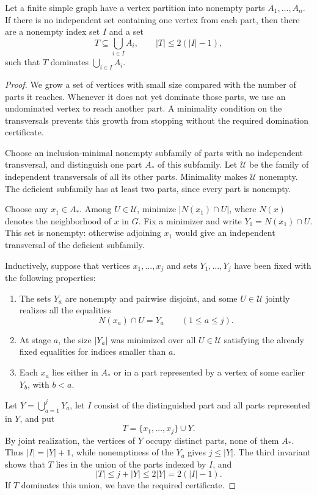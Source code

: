 \begin{lemma}\label{sel-domination}
Let a finite simple graph have a vertex partition into nonempty parts
$A_1,\ldots,A_n$.  If there is no independent set containing one
vertex from each part, then there are a nonempty index set $I$ and a set
\[
 T\subseteq\bigcup_{i\in I}A_i,
 \qquad |T|\le 2(|I|-1),
\]
such that $T$ dominates $\bigcup_{i\in I}A_i$.
\end{lemma}

\begin{proof}
We grow a set of vertices with small size compared with the number
of parts it reaches. Whenever it does not yet dominate those parts,
we use an undominated vertex to reach another part. A minimality
condition on the transversals prevents this growth from stopping
without the required domination certificate.

Choose an inclusion-minimal nonempty subfamily of parts with no
independent transversal, and distinguish one part $A_*$ of this
subfamily.  Let $\mathcal U$ be the family of independent transversals of
all its other parts.  Minimality makes $\mathcal U$ nonempty.  The
deficient subfamily has at least two parts, since every part is nonempty.

Choose any $x_1\in A_*$.  Among $U\in\mathcal U$, minimize
$|N(x_1)\cap U|$, where $N(x)$ denotes the neighborhood of $x$ in $G$.
Fix a minimizer and write $Y_1=N(x_1)\cap U$.  This set is nonempty:
otherwise adjoining $x_1$ would give an independent transversal of the
deficient subfamily.

Inductively, suppose that vertices $x_1,\ldots,x_j$ and sets
$Y_1,\ldots,Y_j$ have been fixed with the following properties:
\begin{enumerate}
 \item The sets $Y_a$ are nonempty and pairwise disjoint, and some
 $U\in\mathcal U$ jointly realizes all the equalities
 \[
   N(x_a)\cap U=Y_a\qquad(1\le a\le j).
 \]
 \item At stage $a$, the size $|Y_a|$ was minimized over all
 $U\in\mathcal U$ satisfying the already fixed equalities for indices
 smaller than $a$.
 \item Each $x_a$ lies either in $A_*$ or in a part represented by a
 vertex of some earlier $Y_b$, with $b<a$.
\end{enumerate}
Let $Y=\bigcup_{a=1}^jY_a$, let $I$ consist of the distinguished part
and all parts represented in $Y$, and put
\[
 T=\{x_1,\ldots,x_j\}\cup Y.
\]
By joint realization, the vertices of $Y$ occupy distinct parts, none
of them $A_*$.  Thus $|I|=|Y|+1$, while nonemptiness of the $Y_a$ gives
$j\le |Y|$.  The third invariant shows that $T$ lies in the union of
the parts indexed by $I$, and
\[
 |T|\le j+|Y|\le 2|Y|=2(|I|-1).
\]
If $T$ dominates this union, we have the required certificate.


\end{proof}

